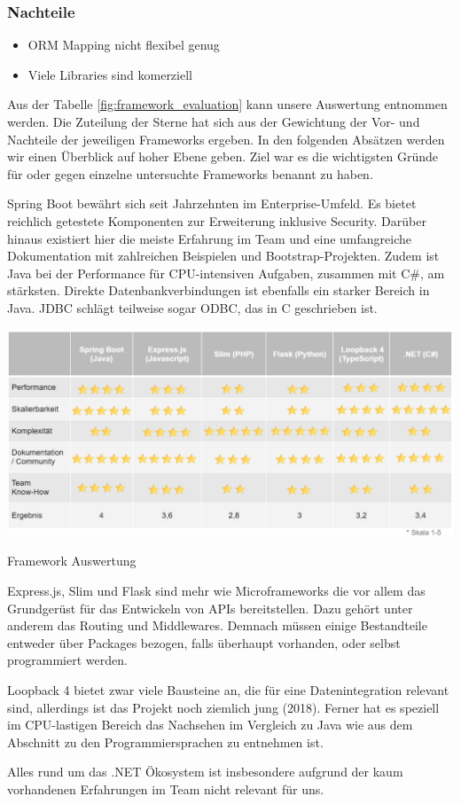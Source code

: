 \subsubsection*{Nachteile}
\begin{itemize}
    \item ORM Mapping nicht flexibel genug
    \item Viele Libraries sind komerziell
\end{itemize}

Aus der Tabelle \ref{fig:framework_evaluation} kann unsere Auswertung entnommen werden. Die Zuteilung der Sterne hat sich aus der Gewichtung der Vor- und Nachteile der jeweiligen Frameworks ergeben. In den folgenden Absätzen werden wir einen Überblick auf hoher Ebene geben. Ziel war es die wichtigsten Gründe für oder gegen einzelne untersuchte Frameworks benannt zu haben.

Spring Boot bewährt sich seit Jahrzehnten im Enterprise-Umfeld. Es bietet reichlich getestete Komponenten zur Erweiterung inklusive Security. Darüber hinaus existiert hier die meiste Erfahrung im Team und eine umfangreiche Dokumentation mit zahlreichen Beispielen und Bootstrap-Projekten. Zudem ist Java bei der Performance für CPU-intensiven Aufgaben, zusammen mit C\#, am stärksten. Direkte Datenbankverbindungen ist ebenfalls ein starker Bereich in Java. JDBC schlägt teilweise sogar ODBC, das in C geschrieben ist.

\begin{table}[]
\centering
\includegraphics[width=16cm]{images/0x_technology_stack/frameworks_comparision_table.png}
\caption{Framework Auswertung}
\label{fig:framework_evaluation}
\end{table}

Express.js, Slim und Flask sind mehr wie Microframeworks die vor allem das Grundgerüst für das Entwickeln von APIs bereitstellen. Dazu gehört unter anderem das Routing und Middlewares. Demnach müssen einige Bestandteile entweder über Packages bezogen, falls überhaupt vorhanden, oder selbst programmiert werden.

Loopback 4 bietet zwar viele Bausteine an, die für eine Datenintegration relevant sind, allerdings ist das Projekt noch ziemlich jung (2018). Ferner hat es speziell im CPU-lastigen Bereich das Nachsehen im Vergleich zu Java wie aus dem Abschnitt zu den Programmiersprachen zu entnehmen ist.

Alles rund um das .NET Ökosystem ist insbesondere aufgrund der kaum vorhandenen Erfahrungen im Team nicht relevant für uns.
